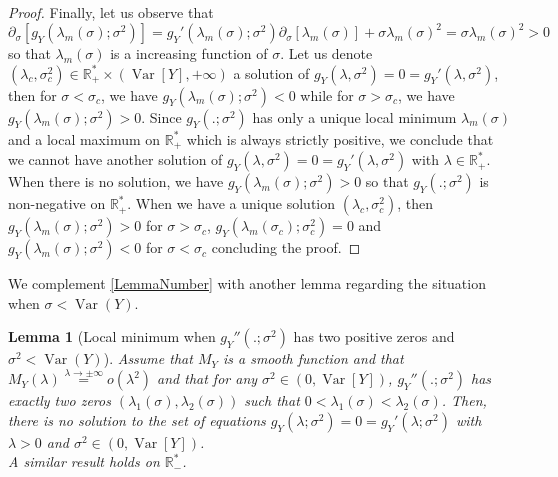 \documentclass[a4paper, 10pt]{article}
\newcommand{\beq}{\begin{equation}}
\newcommand{\eeq}{\end{equation}}
\newtheorem{lemma}{Lemma}[section]
\theoremstyle{definition}
\begin{document}
\begin{proof}
Finally, let us observe that
\beq  \partial_\sigma[g_Y(\lambda_m(\sigma);\sigma^2)]=g_Y'(\lambda_m(\sigma);\sigma^2) \partial_\sigma[\lambda_m(\sigma)]+ \sigma\lambda_m(\sigma)^2=\sigma\lambda_m(\sigma)^2>0\eeq
so that $\lambda_m(\sigma)$ is a increasing function of $\sigma$. Let us denote $(\lambda_c,\sigma_c^2)\in \mathbb{R}_+^*\times \left(\operatorname{Var}[Y],+\infty\right)$ a solution of $g_Y(\lambda,\sigma^2)=0=g_Y'(\lambda,\sigma^2)$, then for $\sigma<\sigma_c$, we have $g_Y(\lambda_m(\sigma);\sigma^2)<0$ while for $\sigma>\sigma_c$, we have $g_Y(\lambda_m(\sigma);\sigma^2)>0$. Since $g_Y(.;\sigma^2)$ has only a unique local minimum $\lambda_m(\sigma)$ and a local maximum on $\mathbb{R}_+^*$ which is always strictly positive, we conclude that we cannot have another solution of $g_Y(\lambda,\sigma^2)=0=g_Y'(\lambda,\sigma^2)$ with $\lambda\in \mathbb{R}_+^*$. When there is no solution, we have $g_Y(\lambda_m(\sigma);\sigma^2)>0$ so that $g_Y(.;\sigma^2)$ is non-negative on $\mathbb{R}_+^*$. When we have a unique solution $(\lambda_c,\sigma_c^2)$, then $g_Y(\lambda_m(\sigma);\sigma^2)>0$ for $\sigma>\sigma_c$, $g_Y(\lambda_m(\sigma_c);\sigma_c^2)=0$ and $g_Y(\lambda_m(\sigma);\sigma^2)<0$ for $\sigma<\sigma_c$ concluding the proof. 
\end{proof}

We complement \autoref{LemmaNumber} with another lemma regarding the situation when $\sigma<\operatorname{Var}(Y)$.

\begin{lemma}[Local minimum when $g_Y''(.;\sigma^2)$ has two positive zeros and $\sigma^2<\operatorname{Var}(Y)$]\label{LemmaNumber2}
Assume that $M_Y$ is a smooth function and that $M_Y(\lambda)\overset{\lambda\to \pm\infty}{=}o(\lambda^2)$ and that for any $\sigma^2\in \left(0,\operatorname{Var}[Y]\right)$, $g_Y''(.;\sigma^2)$ has exactly two zeros $(\lambda_1(\sigma),\lambda_2(\sigma))$ such that $0<\lambda_1(\sigma)<\lambda_2(\sigma)$. Then, there is no solution to the set of equations $g_Y(\lambda;\sigma^2)=0=g_Y'(\lambda;\sigma^2)$ with $\lambda>0$ and $\sigma^2\in \left(0,\operatorname{Var}[Y]\right)$.\\
A similar result holds on $\mathbb{R}_-^*$.
\end{lemma}
\end{document}
